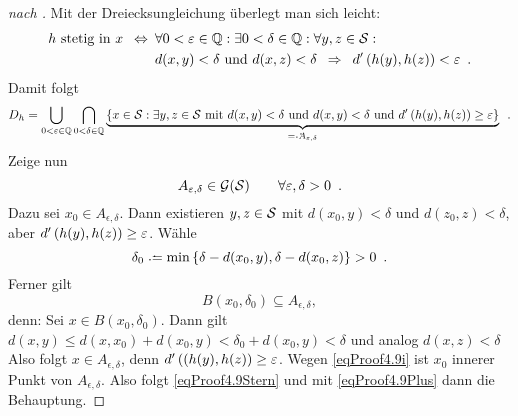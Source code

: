 \begin{proof}[nach {\cite[Appendix]{billingsley2013convergence}}]
	Mit der Dreiecksungleichung überlegt man sich leicht:
	\begin{align*}
		h \text{ stetig in } x
		\equivalent
		&\forall 0 < \epsilon \in \Q : \exists 0 < \delta \in \Q : \forall y,z \in \S : \\
		&d(x,y) < \delta \und d(x,z) < \delta
		\follows d'\brackets{h(y),h(z)} < \epsilon
		\satzende
	\end{align*}
	Damit folgt
	\begin{equation} \label{eqProof4.9Plus}
		D_h = \bigcup_{ 0 < \epsilon \in \Q} \bigcap_{0 < \delta \in \Q} \underbrace{\menge{x \in \S :
		\exists y,z \in \S \mit d(x,y) < \delta \und d(x,y) < \delta \und d'\brackets{h(y),h(z)} \ge \epsilon}}_{\defqe A_{\epsilon,\delta}} \satzende
	\end{equation}
	Zeige nun
	\begin{equation}\label{eqProof4.9Stern}
		A_{\epsilon,\delta} \in \G(\S) \qquad \forall \epsilon,\delta > 0 \satzende
	\end{equation}
	Dazu sei $x_0 \in A_{\epsilon,\delta}$.
	Dann existieren $y,z \in \S$ mit $d(x_0,y) < \delta$ und $d(z_0,z) < \delta$, aber $d'\brackets{h(y),h(z)} \ge \epsilon$.
	Wähle
	\begin{equation*}
		\delta_0 \defeq \min\menge{\delta -  d(x_0,y), \delta - d(x_0,z)} > 0 \satzende
	\end{equation*}
	Ferner gilt
	\begin{equation}\label{eqProof4.9i}
		B(x_0,\delta_0) \subseteq A_{\epsilon,\delta},
	\end{equation}
	denn: Sei $x \in B(x_0,\delta_0)$.
	Dann gilt $d(x,y) \le d(x,x_0) + d(x_0,y) < \delta_0 + d(x_0,y) < \delta$
	und analog $d(x,z) < \delta$
	Also folgt $x \in A_{\epsilon,\delta}$, denn $d'\brackets{(h(y),h(z)} \ge \epsilon$.
	Wegen \eqref{eqProof4.9i} ist $x_0$ innerer Punkt von $A_{\epsilon,\delta}$.
	Also folgt \eqref{eqProof4.9Stern} und mit \eqref{eqProof4.9Plus} dann die Behauptung.
\end{proof}

